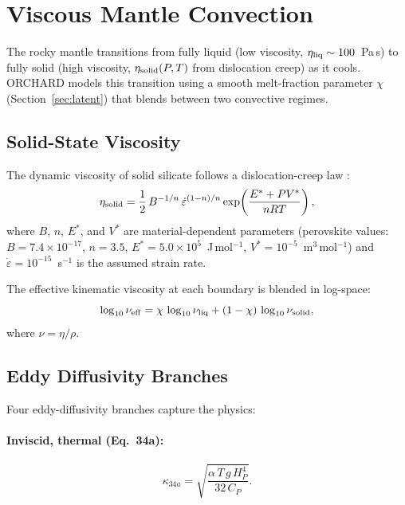 \documentclass{aastex631}
\newcommand{\Hp}{H_P}
\newcommand{\Cp}{C_P}
\begin{document}
\section{Viscous Mantle Convection}\label{sec:viscous}

The rocky mantle transitions from fully liquid (low viscosity,
$\eta_{\rm liq}\sim100$~Pa\,s) to fully solid (high viscosity,
$\eta_{\rm solid}(P,T)$ from dislocation creep) as it cools.  ORCHARD
models this transition using a smooth melt-fraction parameter $\chi$
(Section~\ref{sec:latent}) that blends between two convective regimes.

\subsection{Solid-State Viscosity}

The dynamic viscosity of solid silicate follows a dislocation-creep law
\citep{Ranalli2001}:
\begin{equation}\label{eq:eta_solid}
  \eta_{\rm solid}
  = \frac{1}{2}\,B^{-1/n}\,\dot\varepsilon^{(1-n)/n}
    \exp\!\left(\frac{E^* + PV^*}{nRT}\right),
\end{equation}
where $B$, $n$, $E^*$, and $V^*$ are material-dependent parameters
(perovskite values: $B=7.4\times10^{-17}$, $n=3.5$,
$E^*=5.0\times10^5$~J\,mol$^{-1}$, $V^*=10^{-5}$~m$^3$\,mol$^{-1}$)
and $\dot\varepsilon=10^{-15}$~s$^{-1}$ is the assumed strain rate.

The effective kinematic viscosity at each boundary is blended in
log-space:
\begin{equation}\label{eq:nu_blend}
  \log_{10}\nu_{\rm eff}
  = \chi\,\log_{10}\nu_{\rm liq}
  + (1-\chi)\,\log_{10}\nu_{\rm solid},
\end{equation}
where $\nu = \eta/\rho$.

\subsection{Eddy Diffusivity Branches}

Four eddy-diffusivity branches capture the physics:

\paragraph{Inviscid, thermal (Eq.~34a):}
\begin{equation}\label{eq:kappa34a}
  \kappa_{34a}
  = \sqrt{\frac{\alpha\,T\,g\,\Hp^4}{32\,\Cp}}.
\end{equation}
\end{document}
